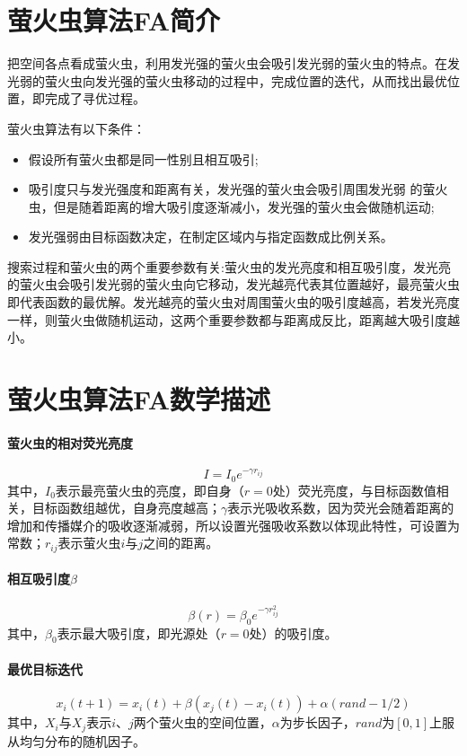 \documentclass[UTF8]{ctexart}
\begin{document}
	\section{萤火虫算法FA简介}把空间各点看成萤火虫，利用发光强的萤火虫会吸引发光弱的萤火虫的特点。在发光弱的萤火虫向发光强的萤火虫移动的过程中，完成位置的迭代，从而找出最优位置，即完成了寻优过程。
	\par 萤火虫算法有以下条件：
	\begin{itemize}
\item 假设所有萤火虫都是同一性别且相互吸引;
\item 吸引度只与发光强度和距离有关，发光强的萤火虫会吸引周围发光弱 的萤火虫，但是随着距离的增大吸引度逐渐减小，发光强的萤火虫会做随机运动;
\item 发光强弱由目标函数决定，在制定区域内与指定函数成比例关系。
    \end{itemize}
\par 搜索过程和萤火虫的两个重要参数有关:萤火虫的发光亮度和相互吸引度，发光亮的萤火虫会吸引发光弱的萤火虫向它移动，发光越亮代表其位置越好，最亮萤火虫即代表函数的最优解。发光越亮的萤火虫对周围萤火虫的吸引度越高，若发光亮度一样，则萤火虫做随机运动，这两个重要参数都与距离成反比，距离越大吸引度越小。
	\section{萤火虫算法FA数学描述}
\paragraph{萤火虫的相对荧光亮度}
$$I=I_0e^{-\gamma r_{ij}}$$
其中，$I_0$表示最亮萤火虫的亮度，即自身（$r=0$处）荧光亮度，与目标函数值相关，目标函数组越优，自身亮度越高；$\gamma$表示光吸收系数，因为荧光会随着距离的增加和传播媒介的吸收逐渐减弱，所以设置光强吸收系数以体现此特性，可设置为常数；$r_{ij}$表示萤火虫$i$与$j$之间的距离。
\paragraph{相互吸引度$\beta$}
$$\beta(r)=\beta_0e^{-\gamma r_{ij}^2}$$
其中，$\beta_0$表示最大吸引度，即光源处（$r=0$处）的吸引度。
\paragraph{最优目标迭代}
$$x_i(t+1)=x_i(t)+\beta(x_j(t)-x_i(t))+\alpha(rand-1/2)$$
其中，$X_i$与$X_j$表示$i$、$j$两个萤火虫的空间位置，$\alpha$为步长因子，$rand$为$[0,1]$上服从均匀分布的随机因子。
\end{document}
